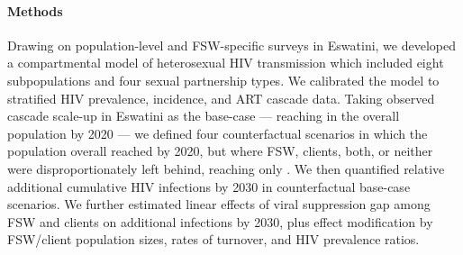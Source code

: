 \paragraph{Methods}
Drawing on population-level and FSW-specific surveys in Eswatini,
we developed a compartmental model of heterosexual HIV transmission
which included eight subpopulations and four sexual partnership types.
We calibrated the model to stratified HIV prevalence, incidence, and ART cascade data.
Taking observed cascade scale-up in Eswatini as the base-case
--- reaching \cashi in the overall population by 2020 ---
we defined four counterfactual scenarios in which
the population overall reached \casmd by 2020,
but where FSW, clients, both, or neither
were disproportionately left behind, reaching only \caslo.
We then quantified relative additional cumulative HIV infections by 2030
in counterfactual \vs base-case scenarios.
We further estimated linear effects of
viral suppression gap among FSW and clients on additional infections by 2030, plus
effect modification by FSW/client population sizes, rates of turnover, and HIV prevalence ratios.
